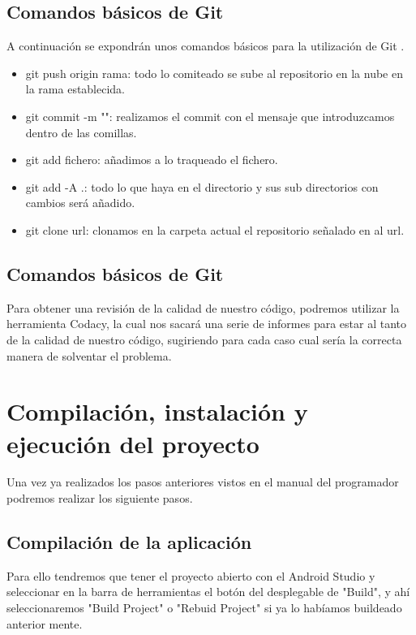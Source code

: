 \subsection{Comandos básicos de Git}
A continuación se expondrán unos comandos básicos para la utilización de Git \cite{git}.
\begin{itemize}
	\item git push origin rama: todo lo comiteado se sube al repositorio en la nube en la rama establecida.
	\item git commit -m "": realizamos el commit con el mensaje que introduzcamos dentro de las comillas.
	\item git add fichero: añadimos a lo traqueado el fichero.
	\item git add -A .: todo lo que haya en el directorio y sus sub directorios con cambios será añadido.
	\item git clone url: clonamos en la carpeta actual el repositorio señalado en al url.
\end{itemize}

\subsection{Comandos básicos de Git}
Para obtener una revisión de la calidad de nuestro código, podremos utilizar la herramienta Codacy\cite{codacy}, la cual nos sacará una serie de informes para estar al tanto de la calidad de nuestro código, sugiriendo para cada caso cual sería la correcta manera de solventar el problema.

\section{Compilación, instalación y ejecución del proyecto}
Una vez ya realizados los pasos anteriores vistos en el manual del programador podremos realizar los siguiente pasos.
\subsection{Compilación de la aplicación}
Para ello tendremos que tener el proyecto abierto con el Android Studio y seleccionar en la barra de herramientas el botón del desplegable de "Build", y ahí seleccionaremos "Build Project" o "Rebuid Project" si ya lo habíamos buildeado anterior mente.
